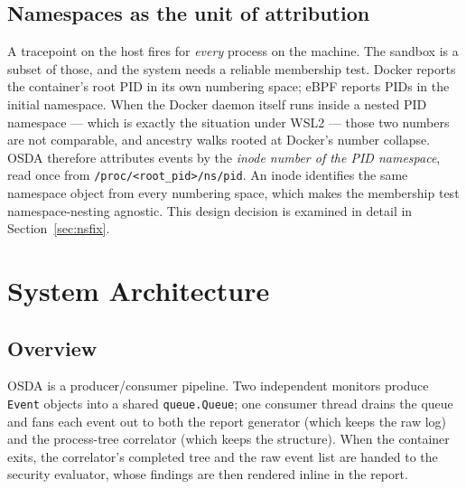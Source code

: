 \documentclass[11pt,a4paper]{article}
\newcommand{\code}[1]{\texttt{\small #1}}
\newcommand{\file}[1]{\texttt{\small #1}}
\begin{document}
\subsection{Namespaces as the unit of attribution}
A tracepoint on the host fires for \emph{every} process on the machine. The sandbox
is a subset of those, and the system needs a reliable membership test. Docker
reports the container's root PID in its own numbering space; eBPF reports PIDs in
the initial namespace. When the Docker daemon itself runs inside a nested PID
namespace --- which is exactly the situation under WSL2 --- those two numbers are not
comparable, and ancestry walks rooted at Docker's number collapse. OSDA therefore
attributes events by the \emph{inode number of the PID namespace}, read once from
\file{/proc/<root\_pid>/ns/pid}. An inode identifies the same namespace object from
every numbering space, which makes the membership test namespace-nesting agnostic.
This design decision is examined in detail in Section~\ref{sec:nsfix}.

\section{System Architecture}

\subsection{Overview}
OSDA is a producer/consumer pipeline. Two independent monitors produce
\code{Event} objects into a shared \code{queue.Queue}; one consumer thread drains
the queue and fans each event out to both the report generator (which keeps the raw
log) and the process-tree correlator (which keeps the structure). When the container
exits, the correlator's completed tree and the raw event list are handed to the
security evaluator, whose findings are then rendered inline in the report.
\end{document}

